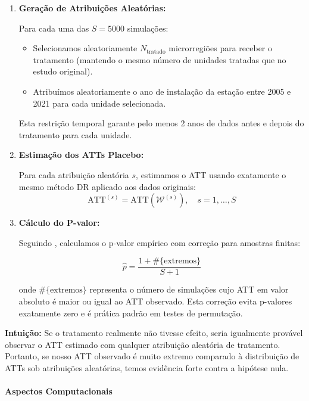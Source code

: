 \documentclass[
	12pt,				%
	oneside,			%
	a4paper,			%
	english,			%
	french,				%
	spanish,			%
	brazil				%
	]{abntex2}
\begin{document}
\begin{enumerate}
\item \textbf{Geração de Atribuições Aleatórias:}
   
   Para cada uma das $S = 5000$ simulações:
   \begin{itemize}
   \item Selecionamos aleatoriamente $N_{\text{tratado}}$ microrregiões para receber o tratamento (mantendo o mesmo número de unidades tratadas que no estudo original).
   \item Atribuímos aleatoriamente o ano de instalação da estação entre 2005 e 2021 para cada unidade selecionada.
   \end{itemize}
   
   Esta restrição temporal garante pelo menos 2 anos de dados antes e depois do tratamento para cada unidade.

\item \textbf{Estimação dos ATTs Placebo:}
   
   Para cada atribuição aleatória $s$, estimamos o ATT usando exatamente o mesmo método DR aplicado aos dados originais:
   \begin{equation}
   \text{ATT}^{(s)} = \text{ATT}(\mathcal{W}^{(s)}), \quad s = 1, \ldots, S
   \end{equation}

\item \textbf{Cálculo do P-valor:}
   
   Seguindo \cite{davison1997}, calculamos o p-valor empírico com correção para amostras finitas:
   
   \begin{equation}
   \hat{p} = \frac{1 + \#\{\text{extremos}\}}{S + 1}
   \end{equation}
   
   onde $\#\{\text{extremos}\}$ representa o número de simulações cujo ATT em valor absoluto é maior ou igual ao ATT observado. Esta correção evita p-valores exatamente zero e é prática padrão em testes de permutação.
\end{enumerate}

\textbf{Intuição:} Se o tratamento realmente não tivesse efeito, seria igualmente provável observar o ATT estimado com qualquer atribuição aleatória de tratamento. Portanto, se nosso ATT observado é muito extremo comparado à distribuição de ATTs sob atribuições aleatórias, temos evidência forte contra a hipótese nula.

\paragraph{Aspectos Computacionais}
\end{document}
